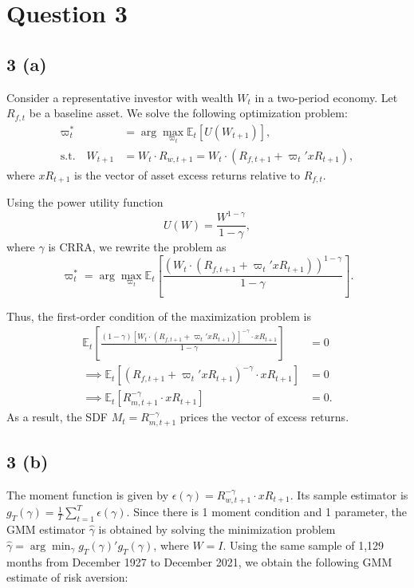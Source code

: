 \documentclass[11pt]{article}
\begin{document}
\section*{Question 3}
\subsection*{3 (a)}
Consider a representative investor with wealth $W_t$ in a two-period economy. Let
$R_{f,t}$ be a baseline asset. We solve the following optimization problem:
\begin{align*}
    \varpi_t^*
    &= \arg\max_{\varpi_t} \mathbb{E}_t\!\left[U(W_{t+1})\right], \\
    \text{s.t.}\quad
    W_{t+1}
    &= W_t \cdot R_{w,t+1}
     = W_t \cdot (R_{f,t+1}+\varpi_t' xR_{t+1}),
\end{align*}
where $xR_{t+1}$ is the vector of asset excess returns relative to $R_{f,t}$.

Using the power utility function
\[
    U(W)=\frac{W^{1-\gamma}}{1-\gamma},
\]
where $\gamma$ is CRRA, we rewrite the problem as
\[
    \varpi_t^*
    = \arg\max_{\varpi_t}
      \mathbb{E}_t\!\left[
        \frac{
          \left(W_t \cdot \left(R_{f,t+1}+\varpi_t' xR_{t+1}\right)\right)^{1-\gamma}
        }{1-\gamma}
      \right].
\]

Thus, the first-order condition of the maximization problem is
\begin{align*}
    \mathbb{E}_t\!\left[
      \frac{
        (1-\gamma) [W_t \cdot
        \left(R_{f,t+1}+\varpi_t' xR_{t+1}\right)]^{-\gamma}
        \cdot xR_{t+1}
      }{1-\gamma}
    \right] &= 0 \\
    \implies
    \mathbb{E}_t\!\left[
      \left(R_{f,t+1}+\varpi_t' xR_{t+1}\right)^{-\gamma}
      \cdot xR_{t+1}
    \right] &= 0 \\
    \implies
    \mathbb{E}_t\!\left[
      R_{m,t+1}^{-\gamma} \cdot xR_{t+1}
    \right] &= 0.
\end{align*}
As a result, the SDF $M_t=R_{m,t+1}^{-\gamma}$ prices the vector of excess returns.

\subsection*{3 (b)}
The moment function is given by $\epsilon(\gamma) = R_{w,t+1}^{-\gamma} \cdot xR_{t+1}$. 
Its sample estimator is $g_{T}(\gamma) = \frac{1}{T}\sum_{t=1}^{T} \epsilon(\gamma)$.
Since there is 1 moment condition and 1 parameter, the GMM estimator $\hat{\gamma}$ is obtained by solving
the minimization problem $\hat{\gamma} = \arg\min_{\gamma} g_{T}(\gamma)'g_{T}(\gamma)$, where $W = I$.
Using the same sample of 1,129 months from December 1927 to December 2021, we obtain the following GMM estimate of risk aversion:
\end{document}

